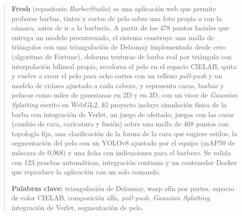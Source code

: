 \begin{abstract}
\noindent
\textbf{Fresh} (repositorio \emph{BarberStudio}) es una aplicación web que permite probarse barbas, tintes y cortes de pelo sobre una foto propia o con la cámara, antes de ir a la barbería. A partir de los 478 puntos faciales que entrega un modelo preentrenado, el sistema construye una malla de triángulos con una triangulación de Delaunay implementada desde cero (algoritmo de Fortune), deforma texturas de barba real por triángulo con interpolación bilineal propia, recolorea el pelo en el espacio CIELAB, quita y vuelve a crear el pelo para ocho cortes con un relleno \emph{pull-push} y un modelo de cráneo ajustado a cada cabeza, y representa caras, barbas y pelucas como miles de gaussianas en 2D y en 3D, con un visor de \emph{Gaussian Splatting} escrito en WebGL2. El proyecto incluye simulación física de la barba con integración de Verlet, un juego de afeitado, juegos con las caras (cambio de cara, caricatura y fusión) sobre una malla de 468 puntos con topología fija, una clasificación de la forma de la cara que sugiere estilos, la segmentación del pelo con un YOLOv8 ajustado por el equipo (mAP50 de máscara de 0{,}968) y una ficha con indicaciones para el barbero. Se valida con 123 pruebas automáticas, integración continua y un contenedor Docker que reproduce la aplicación con un solo comando.

\medskip
\noindent\textbf{Palabras clave:} triangulación de Delaunay, warp afín por partes, espacio de color CIELAB, composición alfa, \emph{pull-push}, \emph{Gaussian Splatting}, integración de Verlet, segmentación de pelo.
\end{abstract}
